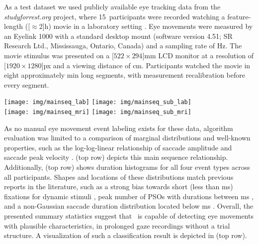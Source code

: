 As a test dataset we used publicly available eye tracking data from the
\textit{studyforrest.org} project, where 15~participants were recorded watching
a feature-length (\unit[$\approx$2]{h}) movie in a laboratory setting
\citep{Hanke2016}. Eye movements were measured by an Eyelink 1000 with a
standard desktop mount (software version 4.51; SR Research Ltd., Mississauga,
Ontario, Canada) and a sampling rate of \unit[1000]{Hz}. The movie stimulus was
presented on a \unit[$522\times294$]{mm} LCD monitor at a resolution of
\unit[$1920\times1280$]{px} and a viewing distance of \unit[85]{cm}. Participants
watched the movie in eight approximately \unit[15]{min} long segments,
with measurement recalibration before every segment.

\begin{figure*}[tbp]
  \texttt{[image: img/mainseq\_lab]}
  \texttt{[image: img/mainseq\_sub\_lab]} \\
  \texttt{[image: img/mainseq\_mri]}
  \texttt{[image: img/mainseq\_sub\_mri]}

  \caption{Main sequence of eye movement events during one 15 minute sequence of
  the movie (segment 2) for lab (top), and MRI participants (bottom). Data
  across all participants per dataset is shown on the left, and data for a single
  exemplary participant on the right.}

  \label{fig:overallComp}
\end{figure*}

As no manual eye movement event labeling exists for these data, algorithm
evaluation was limited to a comparison of marginal distributions and well-known
properties, such as the log-log-linear relationship of saccade amplitude and
saccade peak velocity \citep{bahill1975main}.  (top row)
depicts this main sequence relationship.
%
Additionally,  (top row) shows duration histograms for all four event
types across all participants. Shapes and locations of these distributions
match previous reports in the literature, such as a strong bias towards short
(less than \unit[500]{ms}) fixations for dynamic stimuli
\citep[Fig.~3]{dorr2010variability}, peak number of PSOs with durations between
\unit[10-20]{ms} \citep[Fig.~11]{Nystrom2010AnData}, and a non-Gaussian saccade
duration distribution located below \unit[100]{ms} \citep[Fig.~8, albeit for
static scene perception]{Nystrom2010AnData}.
%
Overall, the presented summary statistics suggest that \remodnav\ is capable
of detecting eye movements with plausible characteristics, in prolonged
gaze recordings without a trial structure. A visualization of such a classification
result is depicted in  (top row).

